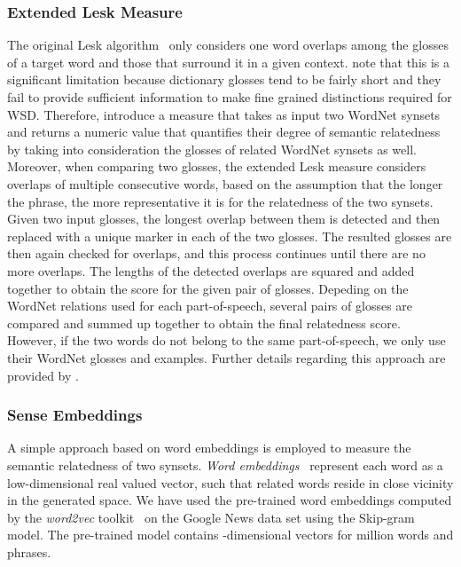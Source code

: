 \documentclass[11pt]{article}
\begin{document}
\subsubsection{Extended Lesk Measure}

The original Lesk algorithm~\cite{Lesk-1986} only considers one word overlaps among the glosses of a target word and those that surround it in a given context.  note that this is a significant limitation because dictionary glosses tend to be fairly short and they fail to provide sufficient information to make fine grained distinctions required for WSD. Therefore,  introduce a measure that takes as input two WordNet synsets and returns a numeric value that quantifies their degree of semantic relatedness by taking into consideration the glosses of related WordNet synsets as well. Moreover, when comparing two glosses, the extended Lesk measure considers overlaps of multiple consecutive words, based on the assumption that the longer the phrase, the more representative it is for the relatedness of the two synsets. Given two input glosses, the longest overlap between them is detected and then replaced with a unique marker in each of the two glosses. The resulted glosses are then again checked for overlaps, and this process continues until there are no more overlaps. The lengths of the detected overlaps are squared and added together to obtain the score for the given pair of glosses. Depeding on the WordNet relations used for each part-of-speech, several pairs of glosses are compared and summed up together to obtain the final relatedness score. However, if the two words do not belong to the same part-of-speech, we only use their WordNet glosses and examples. Further details regarding this approach are provided by .

\subsubsection{Sense Embeddings} 

A simple approach based on word embeddings is employed to measure the semantic relatedness of two synsets. \emph{Word embeddings}~\cite{Bengio-JMLR-2003,Collobert-ICML-2008,Mikolov-NIPS-2013} represent each word as a low-dimensional real valued vector, such that related words reside in close vicinity in the generated space. We have used the pre-trained word embeddings computed by the \emph{word2vec} toolkit~\cite{Mikolov-NIPS-2013} on the Google News data set using the Skip-gram model. The pre-trained model contains -dimensional vectors for  million words and phrases.
\end{document}
